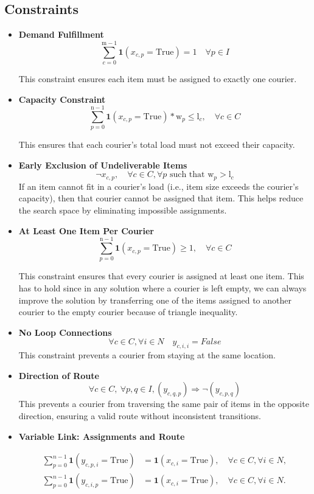 \subsection{Constraints}
\begin{itemize}
\item \textbf{Demand Fulfillment}
\[
\sum_{c=0}^{\text{m}-1} \mathbf{1}(x_{c,p} = \text{True}) = 1 \quad \forall p \in I
\]


This constraint ensures each item must be assigned to exactly one courier. 
\item \textbf{Capacity Constraint}
\[
\sum_{p=0}^{\text{n}-1} \mathbf{1}(x_{c,p} = \text{True}) * \text{w}_{p} \leq \text{l}_{c}, \quad \forall c \in C
\]

This ensures that each courier's total load must not exceed their capacity.
\item \textbf{Early Exclusion of Undeliverable Items}
\[
\neg x_{c,p}, \quad \forall c \in C, \forall p \text{ such that } \text{w}_{p} > \text{l}_{c}
\]
If an item cannot fit in a courier’s load (i.e., item size exceeds the courier's capacity), then that courier cannot be assigned that item. This helps reduce the search space by eliminating impossible assignments.
\item \textbf{At Least One Item Per Courier}
\[
\sum_{p=0}^{\text{n} - 1} \mathbf{1}(x_{c,p} = \text{True}) \geq 1, \quad \forall c \in C
\]

This constraint ensures that every courier is assigned at least one item. This has to hold since in any solution where a courier is left empty, we can always improve the solution by transferring one of the items assigned to another courier to the empty courier because of triangle inequality. 

\item \textbf{No Loop Connections} 
\[ \forall c \in C, \forall i \in N \quad y_{c,i,i} = False \]
This constraint prevents a courier from staying at the same location.
\item \textbf{Direction of Route}
\[
\forall c \in C, \ \forall p,q  \in I, \left( y_{c,q,p} \right) \Rightarrow \neg \left( y_{c,p,q} \right)
\]
This prevents a courier from traversing the same pair of items in the opposite direction, ensuring a valid route without inconsistent transitions.

\item \textbf{Variable Link: Assignments and Route}

\begin{align*}
\sum_{p=0}^{n-1} \mathbf{1}(y_{c,p,i} = \text{True}) &= \mathbf{1}(x_{c,i} = \text{True}), \quad \forall c \in C, \forall i \in N, \\  
\sum_{p=0}^{n-1} \mathbf{1}(y_{c,i,p} = \text{True}) &= \mathbf{1}(x_{c,i} = \text{True}), \quad \forall c \in C, \forall i \in N.
\end{align*}


\end{itemize}
